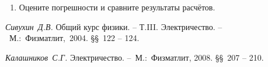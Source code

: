 \begin{lab:task}
\begin{enumerate}
	\begin{center}
\begin{tabular}{|c|c|c|c|c|c|}
\hline
& & \multicolumn{4}{c|}{$Q$}\\
\cline{3-6}
$R$, Ом & $R_{\text{конт}}$ & & & &$f(LCR)$\\
\hline
$0$ & & & & & \\
$100$ & & & & &\\
\hline
\end{tabular}
\end{center}

\begin{figure}[h!]
	\centering\texttt{[image: image4]}
	\caption{Таблица}
\end{figure}

	\item Оцените погрешности и сравните результаты расчётов.
	\end{enumerate}
\end{lab:task}


\begin{lab:literature}
	\item \emph{Сивухин~Д.В.} Общий курс физики. -- Т.III. Электричество. -- ~М.:~Физматлит,~2004. \S\S~122 -- 124.

	\item \emph{Калашников~С.Г.} Электричество. --~М.:~Физматлит, 2008. \S\S~207 -- 210.
\end{lab:literature}
